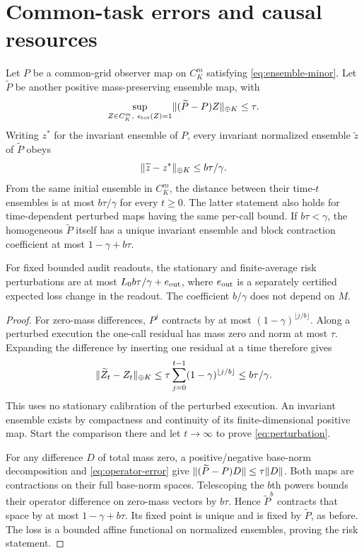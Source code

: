 \section{Common-task errors and causal resources}\label{sec:composition}
\begin{proposition}\label{prop:perturbation}
Let $P$ be a common-grid observer map on $C_K^m$ satisfying \eqref{eq:ensemble-minor}. Let $\widetilde P$ be another positive mass-preserving ensemble map, with
\begin{equation}\label{eq:operator-error}
 \sup_{Z\in C_K^m,\ e_{\rm tot}(Z)=1}
       \lVert(\widetilde P-P)Z\rVert_{\oplus K}\le\tau.
\end{equation}
Writing $z^*$ for the invariant ensemble of $P$, every invariant normalized ensemble $\widetilde z$ of $\widetilde P$ obeys
\begin{equation}\label{eq:perturbation}
 \lVert\widetilde z-z^*\rVert_{\oplus K}\le b\tau/\gamma.
\end{equation}
From the same initial ensemble in $C_K^m$, the distance between their time-$t$ ensembles is at most $b\tau/\gamma$ for every $t\ge0$. The latter statement also holds for time-dependent perturbed maps having the same per-call bound. If $b\tau<\gamma$, the homogeneous $\widetilde P$ itself has a unique invariant ensemble and block contraction coefficient at most $1-\gamma+b\tau$.

For fixed bounded audit readouts, the stationary and finite-average risk perturbations are at most $L_0b\tau/\gamma+e_{\rm out}$, where $e_{\rm out}$ is a separately certified expected loss change in the readout. The coefficient $b/\gamma$ does not depend on $M$.
\end{proposition}
\begin{proof}
For zero-mass differences, $P^j$ contracts by at most
$(1-\gamma)^{\lfloor j/b\rfloor}$. Along a perturbed execution the one-call residual has mass zero and norm at most $\tau$. Expanding the difference by inserting one residual at a time therefore gives
\[
 \lVert\widetilde Z_t-Z_t\rVert_{\oplus K}
 \le\tau\sum_{j=0}^{t-1}(1-\gamma)^{\lfloor j/b\rfloor}
 \le b\tau/\gamma.
\]
This uses no stationary calibration of the perturbed execution. An invariant ensemble exists by compactness and continuity of its finite-dimensional positive map. Start the comparison there and let $t\to\infty$ to prove \eqref{eq:perturbation}.

For any difference $D$ of total mass zero, a positive/negative base-norm decomposition and \eqref{eq:operator-error} give
$\lVert(\widetilde P-P)D\rVert\le\tau\lVert D\rVert$. Both maps are contractions on their full base-norm spaces. Telescoping the $b$th powers bounds their operator difference on zero-mass vectors by $b\tau$. Hence $\widetilde P^b$ contracts that space by at most $1-\gamma+b\tau$. Its fixed point is unique and is fixed by $\widetilde P$, as before. The loss is a bounded affine functional on normalized ensembles, proving the risk statement.
\end{proof}

